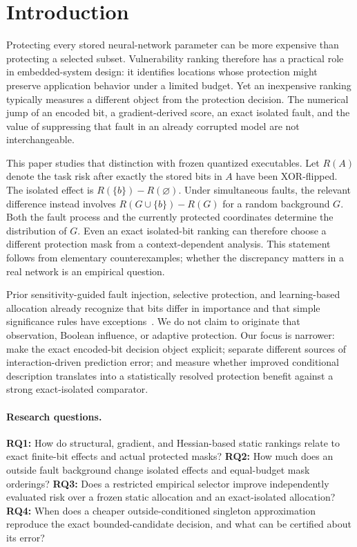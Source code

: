 \section{Introduction}\label{sec:introduction}
Protecting every stored neural-network parameter can be more expensive than protecting a selected subset. Vulnerability ranking therefore has a practical role in embedded-system design: it identifies locations whose protection might preserve application behavior under a limited budget. Yet an inexpensive ranking typically measures a different object from the protection decision. The numerical jump of an encoded bit, a gradient-derived score, an exact isolated fault, and the value of suppressing that fault in an already corrupted model are not interchangeable.

This paper studies that distinction with frozen quantized executables. Let $R(A)$ denote the task risk after exactly the stored bits in $A$ have been XOR-flipped. The isolated effect is $R(\{b\})-R(\varnothing)$. Under simultaneous faults, the relevant difference instead involves $R(G\cup\{b\})-R(G)$ for a random background $G$. Both the fault process and the currently protected coordinates determine the distribution of $G$. Even an exact isolated-bit ranking can therefore choose a different protection mask from a context-dependent analysis. This statement follows from elementary counterexamples; whether the discrepancy matters in a real network is an empirical question.

Prior sensitivity-guided fault injection, selective protection, and learning-based allocation already recognize that bits differ in importance and that simple significance rules have exceptions~\cite{weng2024fkeras,weng2026priorifi,catalan2025redundancy,alobaidi2026selectiveeccdataset}. We do not claim to originate that observation, Boolean influence, or adaptive protection. Our focus is narrower: make the exact encoded-bit decision object explicit; separate different sources of interaction-driven prediction error; and measure whether improved conditional description translates into a statistically resolved protection benefit against a strong exact-isolated comparator.

\paragraph{Research questions.}
\textbf{RQ1:} How do structural, gradient, and Hessian-based static rankings relate to exact finite-bit effects and actual protected masks? \textbf{RQ2:} How much does an outside fault background change isolated effects and equal-budget mask orderings? \textbf{RQ3:} Does a restricted empirical selector improve independently evaluated risk over a frozen static allocation and an exact-isolated allocation? \textbf{RQ4:} When does a cheaper outside-conditioned singleton approximation reproduce the exact bounded-candidate decision, and what can be certified about its error?

